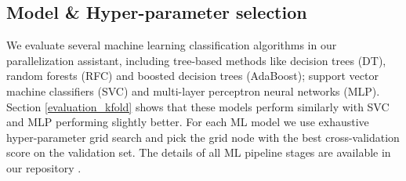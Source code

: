 \subsection{Model \& Hyper-parameter selection}
\label{model_selection}
\quad We evaluate several machine learning classification algorithms in our parallelization assistant, including tree-based methods like decision trees (DT), random forests (RFC) and boosted decision trees (AdaBoost); support vector machine classifiers (SVC) and multi-layer perceptron neural networks (MLP). Section \ref{evaluation_kfold} shows that these models perform similarly with SVC and MLP performing slightly better. For each ML model we use exhaustive hyper-parameter grid search and pick the grid node with the best cross-validation score on the validation set. The details of all ML pipeline stages are available in our repository \cite{assistant-repo}.
